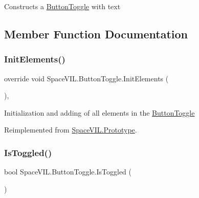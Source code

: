 Constructs a \mbox{\hyperlink{class_space_v_i_l_1_1_button_toggle}{Button\+Toggle}} with text 



\subsection{Member Function Documentation}
\mbox{\label{class_space_v_i_l_1_1_button_toggle_a5e2e938da7e38f0a6378fee26af5a75b}} 
\subsubsection{\texorpdfstring{Init\+Elements()}{InitElements()}}
{\footnotesize\ttfamily override void Space\+V\+I\+L.\+Button\+Toggle.\+Init\+Elements (\begin{DoxyParamCaption}{ }\end{DoxyParamCaption})\hspace{0.3cm}{\ttfamily [inline]}, {\ttfamily [virtual]}}



Initialization and adding of all elements in the \mbox{\hyperlink{class_space_v_i_l_1_1_button_toggle}{Button\+Toggle}} 



Reimplemented from \mbox{\hyperlink{class_space_v_i_l_1_1_prototype_ac3379fe02923ee155b5b0084abf27420}{Space\+V\+I\+L.\+Prototype}}.

\mbox{\label{class_space_v_i_l_1_1_button_toggle_acb981bafc054853c3c55d75f1602d157}} 
\subsubsection{\texorpdfstring{Is\+Toggled()}{IsToggled()}}
{\footnotesize\ttfamily bool Space\+V\+I\+L.\+Button\+Toggle.\+Is\+Toggled (\begin{DoxyParamCaption}{ }\end{DoxyParamCaption})\hspace{0.3cm}{\ttfamily [inline]}}




